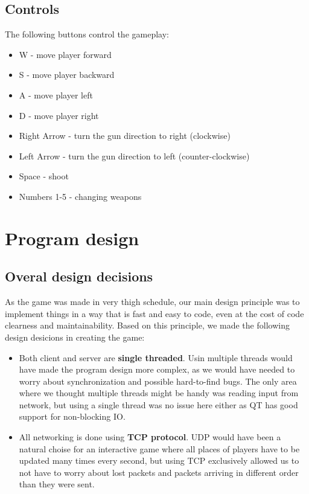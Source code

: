 \documentclass[a4paper,12pt,titlepage]{article}
\begin{document}
\subsection{Controls}
The following buttons control the gameplay:
\begin{itemize}
\item W - move player forward
\item S - move player backward
\item A - move player left
\item D - move player right
\item Right Arrow - turn the gun direction to right (clockwise)
\item Left Arrow - turn the gun direction to left (counter-clockwise)
\item Space - shoot
\item Numbers 1-5 - changing weapons
\end{itemize}

\section{Program design}

\subsection{Overal design decisions}

As the game was made in very thigh schedule, our main design principle was to implement things in a way that is fast and easy to code, even at the cost of code clearness and maintainability. Based on this principle, we made the following design desicions in creating the game:
\begin{itemize}
\item Both client and server are \textbf{single threaded}. Usin multiple threads would have made the program design more complex, as we would have needed to worry about synchronization and possible hard-to-find bugs. The only area where we thought multiple threads might be handy was reading input from network, but using a single thread was no issue here either as QT has good support for non-blocking IO.
\item All networking is done using \textbf{TCP protocol}. UDP would have been a natural choise for an interactive game where all places of players have to be updated many times every second, but using TCP exclusively allowed us to not have to worry about lost packets and packets arriving in different order than they were sent.
\end{itemize}
\end{document}
